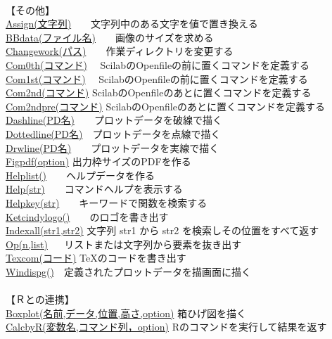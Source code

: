 \documentclass[papersize,a4paper,12pt,uplatex]{jsarticle}
\begin{document}
\begin{tabbing}
　\\
【その他】\\
\hyperlink{assign}{Assign(文字列)}　　\>文字列中のある文字を値で置き換える\\
\hyperlink{bbdata}{BBdata(ファイル名)}　　\>画像のサイズを求める\\
\hyperlink{changework}{Changework(パス)}　　\>作業ディレクトリを変更する\\
\hyperlink{com0th}{Com0th(コマンド)} 　\>ScilabのOpenfileの前に置くコマンドを定義する\\
\hyperlink{com1st}{Com1st(コマンド)} 　\>ScilabのOpenfileの前に置くコマンドを定義する\\
\hyperlink{com2nd}{Com2nd(コマンド)} \>ScilabのOpenfileのあとに置くコマンドを定義する\\
\hyperlink{com2ndpre}{Com2ndpre(コマンド)} \>ScilabのOpenfileのあとに置くコマンドを定義する\\
\hyperlink{dashline}{Dashline(PD名)}　　\>プロットデータを破線で描く\\
\hyperlink{dottedline}{Dottedline(PD名)}　\>プロットデータを点線で描く\\
\hyperlink{drwline}{Drwline(PD名)}　　\>プロットデータを実線で描く\\
\hyperlink{figpdf}{Figpdf(option)} \>出力枠サイズのPDFを作る\\
\hyperlink{helplist}{Helplist()}　　\>ヘルプデータを作る\\
\hyperlink{help}{Help(str)}　　\>コマンドヘルプを表示する\\
\hyperlink{helpkey}{Helpkey(str)}　　\>キーワードで関数を検索する\\
\hyperlink{help}{Ketcindylogo()}　　\>\ketcindy のロゴを書き出す\\
\hyperlink{indexall}{Indexall(str1,str2)} \>文字列 str1 から str2 を検索しその位置をすべて返す\\
\hyperlink{op}{Op(n,list)} 　\> リストまたは文字列から要素を抜き出す\\
\hyperlink{texcom}{Texcom(コード)} \>\TeX のコードを書き出す\\
\hyperlink{windispg}{Windispg()}　\>定義されたプロットデータを描画面に描く\\
　\\
【Ｒとの連携】\\
\hyperlink{boxplot}{Boxplot(名前,データ,位置,高さ,option)} \>箱ひげ図を描く\\
\hyperlink{calcbyr}{CalcbyR(変数名,コマンド列，option)}  \>Rのコマンドを実行して結果を返す\\

\end{tabbing}
\end{document}
